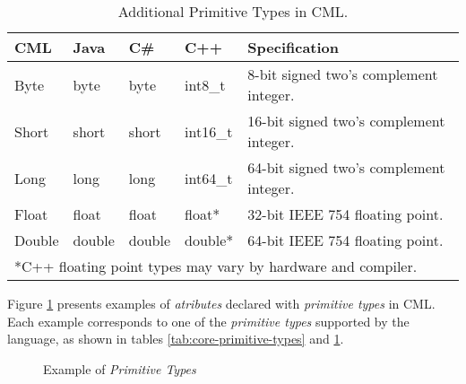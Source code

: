 \begin{table}[h]
\centering
\begin{tabular}
{l l l l p{7cm} }
\hline
CML & Java & C\# & C++ & Specification \\
\hline
Byte & byte & byte & int8\_t & 8-bit signed two's complement integer. \\
Short & short & short & int16\_t & 16-bit signed two's complement integer. \\
Long & long & long & int64\_t & 64-bit signed two's complement integer. \\
Float & float & float & float* & 32-bit IEEE 754 floating point. \\
Double & double & double & double* & 64-bit IEEE 754 floating point. \\
\multicolumn{5}{p{12cm}}{*C++ floating point types may vary by hardware and compiler.}
\end{tabular}
\caption{Additional Primitive Types in CML.}
\label{tab:additional-primitive-types}
\end{table}

\begin{examples}
Figure \ref{fig:ex:primitive-types} presents examples
of \emph{atributes} declared with \emph{primitive types} in CML.
Each example corresponds to one of the \emph{primitive types} 
supported by the language,
as shown in tables \ref{tab:core-primitive-types} and \ref{tab:additional-primitive-types}.
\end{examples}

\begin{figure}
\verbatimfont{\small}

\caption{Example of \emph{Primitive Types}}
\label{fig:ex:primitive-types}
\end{figure}

